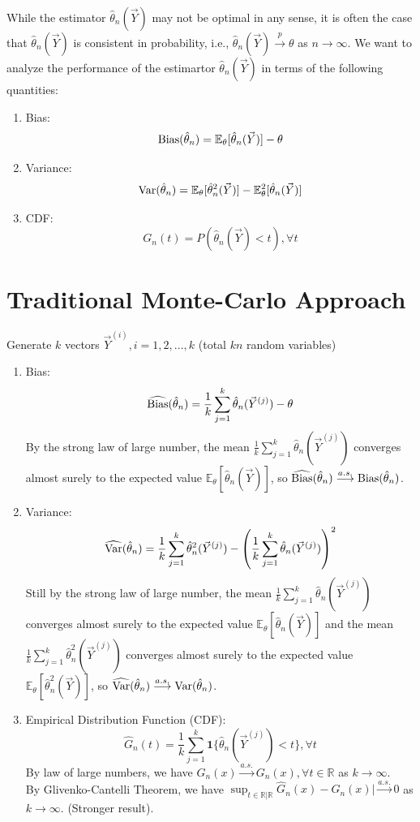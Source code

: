 \documentclass[11pt]{elegantbook}
\begin{document}
While the estimator $\hat{\theta}_n(\vec{Y})$ may not be optimal in any sense, it is often the case that $\hat{\theta}_n(\vec{Y})$ is consistent in probability, i.e., $\hat{\theta}_n(\vec{Y}) \stackrel{p}{\longrightarrow} \theta$ as $n \rightarrow \infty$. We want to analyze the performance of the estimartor $\hat{\theta}_n(\vec{Y})$ in terms of the following quantities:
\begin{enumerate}[(1).]
    \item Bias: $$\textnormal{Bias}(\hat{\theta}_n)= \mathbb{E}_{\theta}[\hat{\theta}_n(\vec{Y})]-\theta$$
    \item Variance: $$\textnormal{Var}(\hat{\theta}_n)=\mathbb{E}_{\theta}[\hat{\theta}_n^2(\vec{Y})]-\mathbb{E}_{\theta}^2[\hat{\theta}_n(\vec{Y})]$$
    \item CDF: $$G_{n}(t)=P(\hat{\theta}_n(\vec{Y})<t),\forall t$$
\end{enumerate}

\section{Traditional Monte-Carlo Approach}
Generate $k$ vectors $\vec{Y}^{(i)},i=1,2,...,k$ (total $kn$ random variables)
\begin{enumerate}[(1).]
    \item Bias: $$\widehat{\textnormal{Bias}}(\hat{\theta}_n)=\frac{1}{k}\sum_{j=1}^k \hat{\theta}_n(\vec{Y}^{(j)})-\theta$$
    By the strong law of large number, the mean $\frac{1}{k}\sum_{j=1}^k \hat{\theta}_n(\vec{Y}^{(j)})$ converges almost surely to the expected value $\mathbb{E}_{\theta}[\hat{\theta}_n(\vec{Y})]$, so $\widehat{\textnormal{Bias}}(\hat{\theta}_n) \stackrel{a.s.}{\longrightarrow} \textnormal{Bias}(\hat{\theta}_n)$.
    \item Variance: $$\widehat{\textnormal{Var}}(\hat{\theta}_n)=\frac{1}{k}\sum_{j=1}^k \hat{\theta}^2_n(\vec{Y}^{(j)})-\left(\frac{1}{k}\sum_{j=1}^k \hat{\theta}_n(\vec{Y}^{(j)})\right)^2$$
    Still by the strong law of large number, the mean $\frac{1}{k}\sum_{j=1}^k \hat{\theta}_n(\vec{Y}^{(j)})$ converges almost surely to the expected value $\mathbb{E}_{\theta}[\hat{\theta}_n(\vec{Y})]$ and the mean $\frac{1}{k}\sum_{j=1}^k \hat{\theta}^2_n(\vec{Y}^{(j)})$ converges almost surely to the expected value $\mathbb{E}_{\theta}[\hat{\theta}^2_n(\vec{Y})]$, so $\widehat{\textnormal{Var}}(\hat{\theta}_n) \stackrel{a.s.}{\longrightarrow} \textnormal{Var}(\hat{\theta}_n)$.
    \item Empirical Distribution Function (CDF): $$\hat{G}_{n}(t)=\frac{1}{k}\sum_{j=1}^k \mathbf{1}\{\hat{\theta}_n(\vec{Y}^{(j)})<t\},\forall t$$
    By law of large numbers, we have $\hat{G}_n(x) \stackrel{a.s.}{\longrightarrow} G_n(x),\forall t\in \mathbb{R}$ as $k \rightarrow \infty$.\\
    By Glivenko-Cantelli Theorem, we have $\sup_{t\in \mathbb{R} |\mathbb{R}}\hat{G}_n(x) - G_n(x)| \stackrel{a.s.}{\longrightarrow} 0$ as $k \rightarrow \infty$. (Stronger result).
\end{enumerate}
\end{document}

